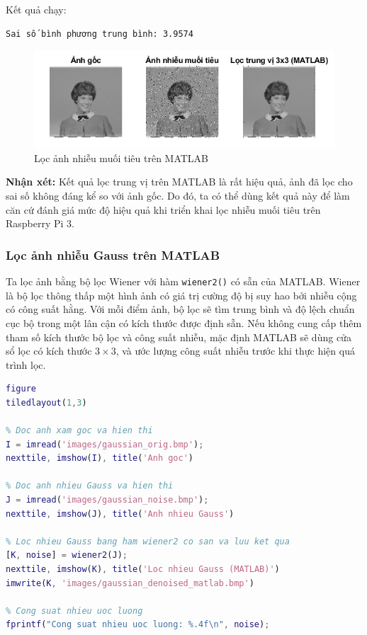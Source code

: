 Kết quả chạy:

\begin{verbatim}
Sai số bình phương trung bình: 3.9574
\end{verbatim}

\begin{figure}[H]
    \centering
    \includegraphics[width=1\linewidth]{images/salt_pepper_denoise_matlab.png}
    \caption{Lọc ảnh nhiễu muối tiêu trên MATLAB}
    \label{fig:salt_pepper_denoise_matlab}
\end{figure}

\textbf{Nhận xét:} Kết quả lọc trung vị trên MATLAB là rất hiệu quả, ảnh đã lọc cho sai số không đáng kể so với ảnh gốc. Do đó, ta có thể dùng kết quả này để làm căn cứ đánh giá mức độ hiệu quả khi triển khai lọc nhiễu muối tiêu trên Raspberry Pi 3.

\subsubsection{Lọc ảnh nhiễu Gauss trên MATLAB}

Ta lọc ảnh bằng bộ lọc Wiener với hàm \texttt{wiener2()} có sẵn của MATLAB. Wiener là bộ lọc thông thấp một hình ảnh có giá trị cường độ bị suy hao bởi nhiễu cộng có công suất hằng. Với mỗi điểm ảnh, bộ lọc sẽ tìm trung bình và độ lệch chuẩn cục bộ trong một lân cận có kích thước được định sẵn.
Nếu không cung cấp thêm tham số kích thước bộ lọc và công suất nhiễu, mặc định MATLAB sẽ dùng cửa sổ lọc có kích thước $3 \times 3$, và ước lượng công suất nhiễu trước khi thực hiện quá trình lọc.

\begin{lstlisting}[language=MATLAB]
figure
tiledlayout(1,3)

% Doc anh xam goc va hien thi
I = imread('images/gaussian_orig.bmp');
nexttile, imshow(I), title('Anh goc')

% Doc anh nhieu Gauss va hien thi
J = imread('images/gaussian_noise.bmp');
nexttile, imshow(J), title('Anh nhieu Gauss')

% Loc nhieu Gauss bang ham wiener2 co san va luu ket qua
[K, noise] = wiener2(J);
nexttile, imshow(K), title('Loc nhieu Gauss (MATLAB)')
imwrite(K, 'images/gaussian_denoised_matlab.bmp')

% Cong suat nhieu uoc luong
fprintf("Cong suat nhieu uoc luong: %.4f\n", noise);
\end{lstlisting}

